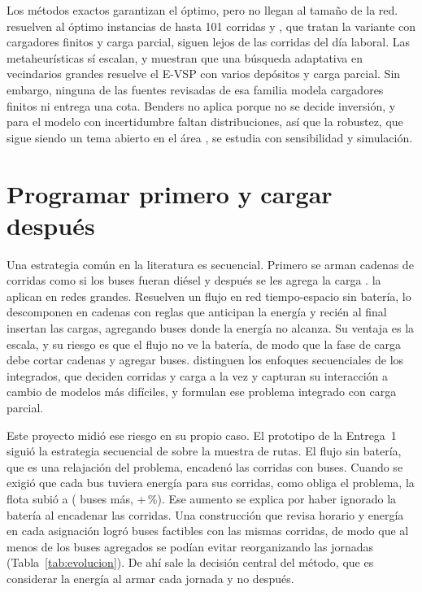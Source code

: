 Los métodos exactos garantizan el óptimo, pero no llegan al tamaño de la red.  resuelven al óptimo instancias de hasta 101 corridas y , que tratan la variante con cargadores finitos y carga parcial, siguen lejos de las \CorridasLaboral{} corridas del día laboral. Las metaheurísticas sí escalan, y  muestran que una búsqueda adaptativa en vecindarios grandes resuelve el E-VSP con varios depósitos y carga parcial. Sin embargo, ninguna de las fuentes revisadas de esa familia modela cargadores finitos ni entrega una cota. Benders no aplica porque no se decide inversión, y para el modelo con incertidumbre faltan distribuciones, así que la robustez, que sigue siendo un tema abierto en el área \cite{wang_bevretrospective_2025}, se estudia con sensibilidad y simulación.

\section{Programar primero y cargar después}
\label{sec:evolucion}

Una estrategia común en la literatura es secuencial. Primero se arman cadenas de corridas como si los buses fueran diésel y después se les agrega la carga \cite{perumal_evspreview_2022}.  la aplican en redes grandes. Resuelven un flujo en red tiempo-espacio sin batería, lo descomponen en cadenas con reglas que anticipan la energía y recién al final insertan las cargas, agregando buses donde la energía no alcanza. Su ventaja es la escala, y su riesgo es que el flujo no ve la batería, de modo que la fase de carga debe cortar cadenas y agregar buses.  distinguen los enfoques secuenciales de los integrados, que deciden corridas y carga a la vez y capturan su interacción a cambio de modelos más difíciles, y  formulan ese problema integrado con carga parcial.

Este proyecto midió ese riesgo en su propio caso. El prototipo de la Entrega~1 siguió la estrategia secuencial de  sobre la muestra de \EdosRutasMuestra{} rutas. El flujo sin batería, que es una relajación del problema, encadenó las corridas con \EdosFlotaFaseUno{} buses. Cuando se exigió que cada bus tuviera energía para sus corridas, como obliga el problema, la flota subió a \EdosBusesPrototipoSinMejora{} (\EdosAumentoBateria{} buses más, +\EdosPctAumentoBateria\,\%). Ese aumento se explica por haber ignorado la batería al encadenar las corridas. Una construcción que revisa horario y energía en cada asignación logró \EdosBusesConstruccion{} buses factibles con las mismas corridas, de modo que al menos \EdosEvitables{} de los buses agregados se podían evitar reorganizando las jornadas (Tabla~\ref{tab:evolucion}). De ahí sale la decisión central del método, que es considerar la energía al armar cada jornada y no después.

